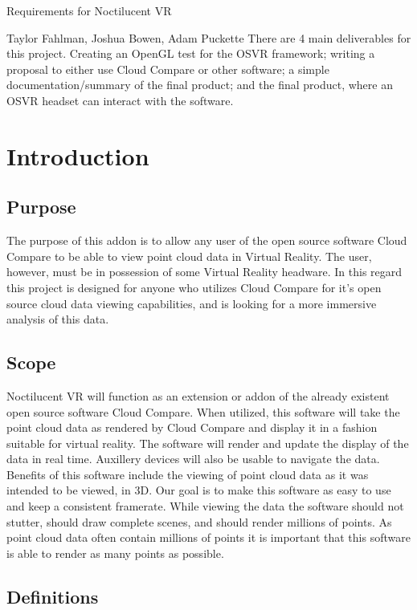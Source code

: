 \documentclass[titlepage]{article}
\begin{document}
\begin{titlepage}
\centering
{\Huge Requirements for Noctilucent VR\par}
{\Large Taylor Fahlman, Joshua Bowen, Adam Puckette}
\abstract
There are 4 main deliverables for this project. Creating an OpenGL test for the OSVR framework;
writing a proposal to either use Cloud Compare or other software; a simple documentation/summary of
the final product; and the final product, where an OSVR headset can interact with the software.
\end{titlepage}

\section{Introduction}
\subsection{Purpose}

The purpose of this addon is to allow any user of the open source software Cloud Compare to be able to view point cloud data in Virtual Reality.
The user, however, must be in possession of some Virtual Reality headware. 
In this regard this project is designed for anyone who utilizes Cloud Compare for it's open source cloud data viewing capabilities,
and is looking for a more immersive analysis of this data.

\subsection{Scope}

Noctilucent VR will function as an extension or addon of the already existent open source software Cloud Compare.
When utilized, this software will take the point cloud data as rendered by Cloud Compare and display it in a fashion suitable for virtual reality.
The software will render and update the display of the data in real time.
Auxillery devices will also be usable to navigate the data.
Benefits of this software include the viewing of point cloud data as it was intended to be viewed, in 3D.
Our goal is to make this software as easy to use and keep a consistent framerate.
While viewing the data the software should not stutter,
should draw complete scenes,
and should render millions of points.
As point cloud data often contain millions of points it is important that this software is able to render as many points as possible.

\subsection{Definitions}
\end{document}

